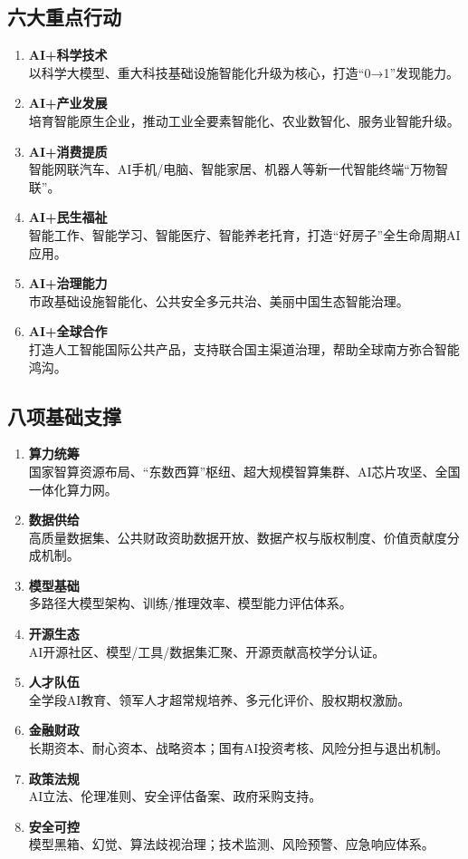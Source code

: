 \subsection{六大重点行动}
\begin{enumerate}[leftmargin=*, nosep]
    \item \textbf{AI+科学技术}  \\
    以科学大模型、重大科技基础设施智能化升级为核心，打造“0→1”发现能力。
    \item \textbf{AI+产业发展}  \\
    培育智能原生企业，推动工业全要素智能化、农业数智化、服务业智能升级。
    \item \textbf{AI+消费提质}  \\
    智能网联汽车、AI手机/电脑、智能家居、机器人等新一代智能终端“万物智联”。
    \item \textbf{AI+民生福祉}  \\
    智能工作、智能学习、智能医疗、智能养老托育，打造“好房子”全生命周期AI应用。
    \item \textbf{AI+治理能力}  \\
    市政基础设施智能化、公共安全多元共治、美丽中国生态智能治理。
    \item \textbf{AI+全球合作}  \\
    打造人工智能国际公共产品，支持联合国主渠道治理，帮助全球南方弥合智能鸿沟。
\end{enumerate}

\subsection{八项基础支撑}
\begin{enumerate}[leftmargin=*, nosep]
    \item \textbf{算力统筹}  \\
    国家智算资源布局、“东数西算”枢纽、超大规模智算集群、AI芯片攻坚、全国一体化算力网。
    \item \textbf{数据供给}  \\
    高质量数据集、公共财政资助数据开放、数据产权与版权制度、价值贡献度分成机制。
    \item \textbf{模型基础}  \\
    多路径大模型架构、训练/推理效率、模型能力评估体系。
    \item \textbf{开源生态}  \\
    AI开源社区、模型/工具/数据集汇聚、开源贡献高校学分认证。
    \item \textbf{人才队伍}  \\
    全学段AI教育、领军人才超常规培养、多元化评价、股权期权激励。
    \item \textbf{金融财政}  \\
    长期资本、耐心资本、战略资本；国有AI投资考核、风险分担与退出机制。
    \item \textbf{政策法规}  \\
    AI立法、伦理准则、安全评估备案、政府采购支持。
    \item \textbf{安全可控}  \\
    模型黑箱、幻觉、算法歧视治理；技术监测、风险预警、应急响应体系。
\end{enumerate}

